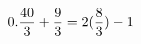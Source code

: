 \documentclass[preview]{standalone}
\begin{document}
\begin{align*}
\special{dvisvgm:raw <g id='unique000'>}0.\frac{40}{3} + \frac{9}{3} = 2(\frac{8}{3}) - 1\special{dvisvgm:raw </g>}
\end{align*}
\end{document}
